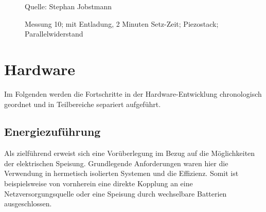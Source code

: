 \documentclass[12pt]{scrreprt} %
\begin{document}
\begin {figure}[htbp]
\caption[Messung 10; 2 Minuten Setz-Zeit; Piezostack; Parallelwiderstand]{Messung 10; mit Entladung, 2 Minuten Setz-Zeit; Piezostack; Parallelwiderstand}
      \begin{center}
      \end{center}
Quelle: Stephan Jobstmann
\label{fig:2.10}
\end{figure}
%
\chapter{Hardware}
Im Folgenden werden die Fortschritte in der Hardware-Entwicklung chronologisch geordnet und in Teilbereiche separiert aufgeführt.
\section{Energiezuführung}
Als zielführend erweist sich eine Vorüberlegung im Bezug auf die Möglichkeiten der elektrischen Speisung. Grundlegende Anforderungen waren hier die Verwendung in hermetisch isolierten Systemen und die Effizienz. Somit ist beispielsweise von vornherein eine direkte Kopplung an eine Netzversorgungsquelle oder eine Speisung durch wechselbare Batterien ausgeschlossen. 
\end{document}
